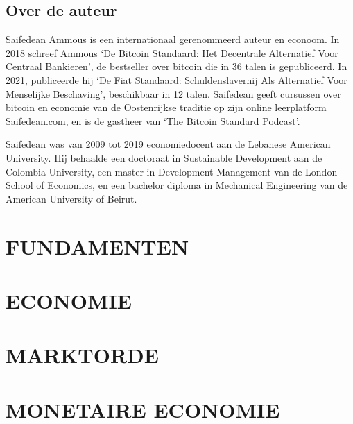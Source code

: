 \documentclass[smalldemyvopaper,11pt,twoside,onecolumn,openright,extrafontsizes]{memoir}
\begin{document}

\chapter{Over de auteur}
Saifedean Ammous is een internationaal gerenommeerd auteur en econoom. In 2018 schreef Ammous `De Bitcoin Standaard: Het Decentrale Alternatief Voor Centraal Bankieren', de bestseller over bitcoin die in 36 talen is gepubliceerd. In 2021, publiceerde hij `De Fiat Standaard: Schuldenslavernij Als Alternatief Voor Menselijke Beschaving', beschikbaar in 12 talen. Saifedean geeft cursussen over bitcoin en economie van de Oostenrijkse traditie op zijn online leerplatform Saifedean.com, en is de gastheer van `The Bitcoin Standard Podcast'.

Saifedean was van 2009 tot 2019 economiedocent aan de {Lebanese American University}. Hij behaalde een doctoraat in Sustainable Development aan de {Colombia University}, een master in Development Management van de {London School of Economics}, en een bachelor diploma in Mechanical Engineering van de {American University of Beirut}.



\mainmatter


\part{FUNDAMENTEN}




\part{ECONOMIE}






\part{MARKTORDE}





\part{MONETAIRE ECONOMIE}



\end{document}
